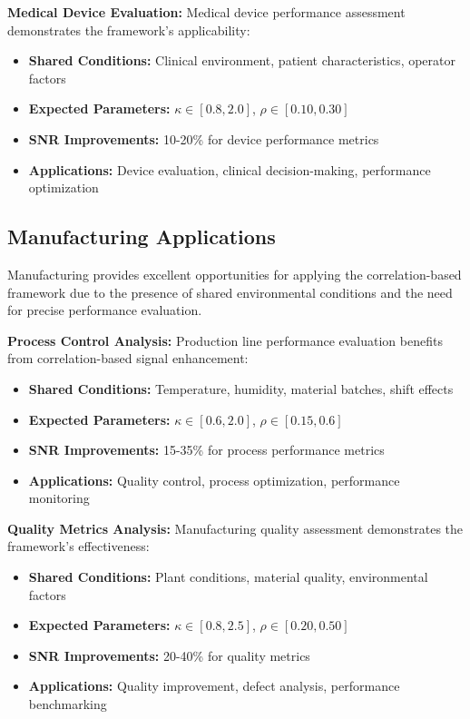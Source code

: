 \textbf{Medical Device Evaluation:}
Medical device performance assessment demonstrates the framework's applicability:
\begin{itemize}
    \item \textbf{Shared Conditions:} Clinical environment, patient characteristics, operator factors
    \item \textbf{Expected Parameters:} $\kappa \in [0.8, 2.0]$, $\rho \in [0.10, 0.30]$
    \item \textbf{SNR Improvements:} 10-20\% for device performance metrics
    \item \textbf{Applications:} Device evaluation, clinical decision-making, performance optimization
\end{itemize}

\subsection{Manufacturing Applications}

Manufacturing provides excellent opportunities for applying the correlation-based framework due to the presence of shared environmental conditions and the need for precise performance evaluation.

\textbf{Process Control Analysis:}
Production line performance evaluation benefits from correlation-based signal enhancement:
\begin{itemize}
    \item \textbf{Shared Conditions:} Temperature, humidity, material batches, shift effects
    \item \textbf{Expected Parameters:} $\kappa \in [0.6, 2.0]$, $\rho \in [0.15, 0.6]$
    \item \textbf{SNR Improvements:} 15-35\% for process performance metrics
    \item \textbf{Applications:} Quality control, process optimization, performance monitoring
\end{itemize}

\textbf{Quality Metrics Analysis:}
Manufacturing quality assessment demonstrates the framework's effectiveness:
\begin{itemize}
    \item \textbf{Shared Conditions:} Plant conditions, material quality, environmental factors
    \item \textbf{Expected Parameters:} $\kappa \in [0.8, 2.5]$, $\rho \in [0.20, 0.50]$
    \item \textbf{SNR Improvements:} 20-40\% for quality metrics
    \item \textbf{Applications:} Quality improvement, defect analysis, performance benchmarking
\end{itemize}

